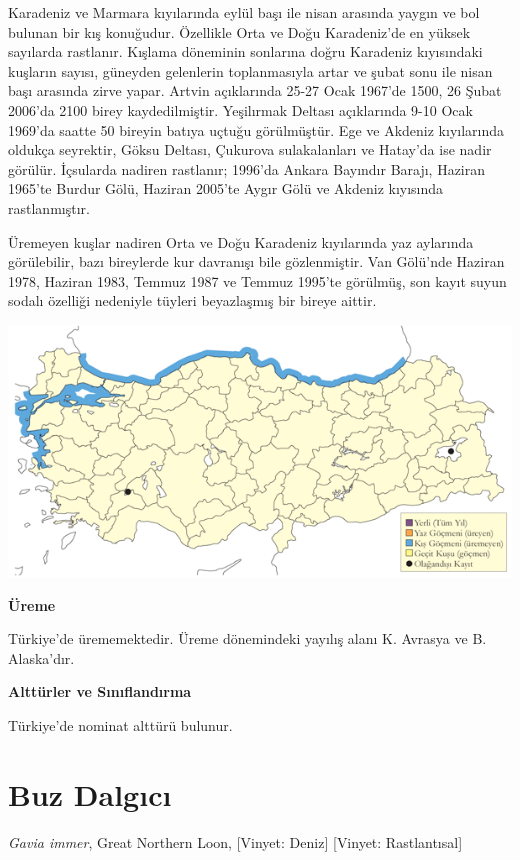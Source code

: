 \documentclass[
  a4paper,
  DIV=11,
  numbers=noendperiod]{scrreprt}
\begin{document}
Karadeniz ve Marmara kıyılarında eylül başı ile nisan arasında yaygın ve
bol bulunan bir kış konuğudur. Özellikle Orta ve Doğu Karadeniz'de en
yüksek sayılarda rastlanır. Kışlama döneminin sonlarına doğru Karadeniz
kıyısındaki kuşların sayısı, güneyden gelenlerin toplanmasıyla artar ve
şubat sonu ile nisan başı arasında zirve yapar. Artvin açıklarında 25-27
Ocak 1967'de 1500, 26 Şubat 2006'da 2100 birey kaydedilmiştir.
Yeşilırmak Deltası açıklarında 9-10 Ocak 1969'da saatte 50 bireyin
batıya uçtuğu görülmüştür. Ege ve Akdeniz kıyılarında oldukça seyrektir,
Göksu Deltası, Çukurova sulakalanları ve Hatay'da ise nadir görülür.
İçsularda nadiren rastlanır; 1996'da Ankara Bayındır Barajı, Haziran
1965'te Burdur Gölü, Haziran 2005'te Aygır Gölü ve Akdeniz kıyısında
rastlanmıştır.

Üremeyen kuşlar nadiren Orta ve Doğu Karadeniz kıyılarında yaz aylarında
görülebilir, bazı bireylerde kur davranışı bile gözlenmiştir. Van
Gölü'nde Haziran 1978, Haziran 1983, Temmuz 1987 ve Temmuz 1995'te
görülmüş, son kayıt suyun sodalı özelliği nedeniyle tüyleri beyazlaşmış
bir bireye aittir.

\includegraphics{images/harita_Page_046.png}

\textbf{Üreme}

Türkiye'de ürememektedir. Üreme dönemindeki yayılış alanı K. Avrasya ve
B. Alaska'dır.

\textbf{Alttürler ve Sınıflandırma}

Türkiye'de nominat alttürü bulunur.

\section{Buz Dalgıcı}\label{buz-dalgux131cux131}

\emph{Gavia immer}, Great Northern Loon, {[}Vinyet: Deniz{]} {[}Vinyet:
Rastlantısal{]}
\end{document}

